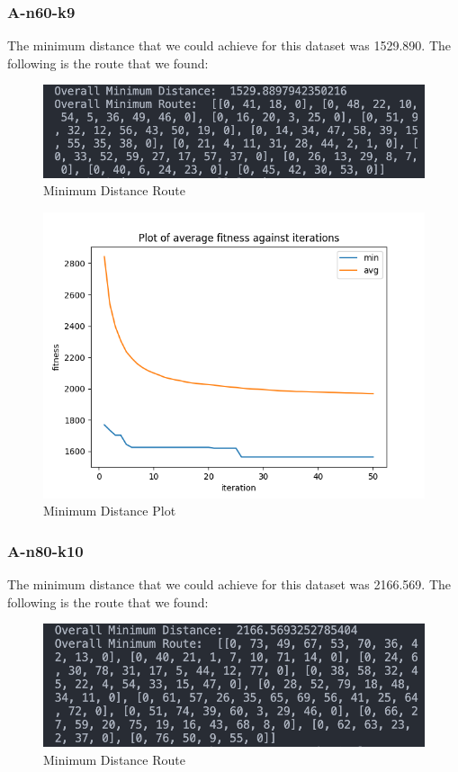 \documentclass{article}
\begin{document}
\subsubsection{A-n60-k9}
The minimum distance that we could achieve for this dataset was 1529.890. The following is the route that we found:
\begin{figure}[H]
  \centering
  \includegraphics[width=1\linewidth]{images/min_dist_n60-k9.png}
  \caption{Minimum Distance Route}
\end{figure}

\begin{figure}[H]
  \centering
  \includegraphics[width=1\linewidth]{images/min_n60-k9.png}
  \caption{Minimum Distance Plot}
\end{figure}

\subsubsection{A-n80-k10}
The minimum distance that we could achieve for this dataset was 2166.569. The following is the route that we found:
\begin{figure}[H]
  \centering
  \includegraphics[width=1\linewidth]{images/min_dist_n80-k10.png}
  \caption{Minimum Distance Route}
\end{figure}
\end{document}
